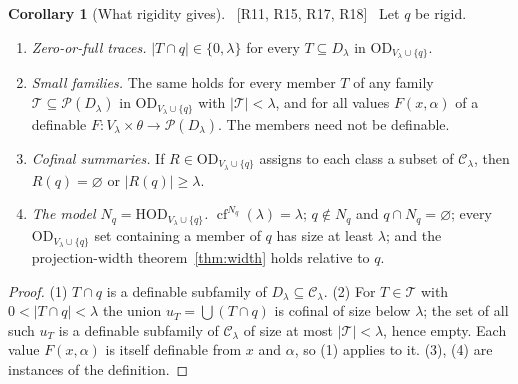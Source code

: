 \documentclass[11pt,letterpaper]{article}
\theoremstyle{definition}
\newtheorem{corollary}[definition]{Corollary}
\numberwithin{equation}{section}
\newcommand{\HOD}{\mathrm{HOD}}
\newcommand{\OD}{\mathrm{OD}}
\newcommand{\cf}{\operatorname{cf}}
\newcommand{\Pow}{\mathcal P}
\newcommand{\Clam}{\mathcal C_\lambda}
\newcommand{\src}[1]{\unskip\ {\normalfont\small\sffamily\color{Olive}[#1]}\ }
\begin{document}
\begin{corollary}[What rigidity gives]\label{cor:rigid}\src{R11, R15, R17, R18}
Let $q$ be rigid.
\begin{enumerate}
\item \emph{Zero-or-full traces.} $|T\cap q|\in\{0,\lambda\}$ for every $T\subseteq D_\lambda$ in $\OD_{V_\lambda\cup\{q\}}$.
\item \emph{Small families.} The same holds for every member $T$ of any family $\mathcal T\subseteq\Pow(D_\lambda)$ in $\OD_{V_\lambda\cup\{q\}}$ with $|\mathcal T|<\lambda$, and for all values $F(x,\alpha)$ of a definable $F:V_\lambda\times\theta\to\Pow(D_\lambda)$. The members need not be definable.
\item \emph{Cofinal summaries.} If $R\in\OD_{V_\lambda\cup\{q\}}$ assigns to each class a subset of $\Clam$, then $R(q)=\varnothing$ or $|R(q)|\ge\lambda$.
\item \emph{The model $N_q=\HOD_{V_\lambda\cup\{q\}}$.} $\cf^{N_q}(\lambda)=\lambda$; $q\notin N_q$ and $q\cap N_q=\varnothing$; every $\OD_{V_\lambda\cup\{q\}}$ set containing a member of $q$ has size at least $\lambda$; and the projection-width theorem~\ref{thm:width} holds relative to $q$.
\end{enumerate}
\end{corollary}

\begin{proof}
(1) $T\cap q$ is a definable subfamily of $D_\lambda\subseteq\Clam$. (2) For $T\in\mathcal T$ with $0<|T\cap q|<\lambda$ the union $u_T=\bigcup(T\cap q)$ is cofinal of size below $\lambda$; the set of all such $u_T$ is a definable subfamily of $\Clam$ of size at most $|\mathcal T|<\lambda$, hence empty. Each value $F(x,\alpha)$ is itself definable from $x$ and $\alpha$, so (1) applies to it. (3), (4) are instances of the definition.
\end{proof}
\end{document}
